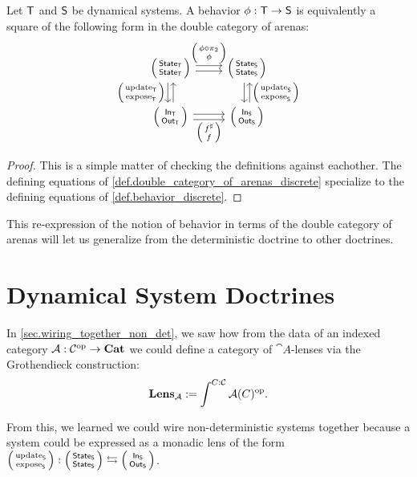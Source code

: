 \documentclass[DynamicalBook]{subfiles}
\begin{document}
\begin{proposition}\label{prop.behavior_as_square_of_arenas_discrete}
  Let $\mathsf{T}$ and $\mathsf{S}$ be dynamical systems. A behavior $\phi : \mathsf{T}
  \to \mathsf{S}$ is equivalently a square of the following form in the double
  category of arenas:
  \begin{equation}\label{eqn.behavior_as_square_of_arenas_discrete}
    \begin{tikzcd}
      \lens{\State{T}}{\State{T}} \ar[r, shift left, "\lens{\phi \circ
        \pi_2}{\phi}"] \ar[r, shift right] \ar[d, shift right,
      "\lens{\update{T}}{\expose{T}}"'] \ar[d, shift left, leftarrow] &
      \lens{\State{S}}{\State{S}} \ar[d, shift left, leftarrow,
      "\lens{\update{S}}{\expose{S}}"] \ar[d, shift right]\\
      \lens{\In{T}}{\Out{T}} \ar[r, shift right, "\lens{f^{\sharp}}{f}"'] \ar[r,
      shift left] & \lens{\In{S}}{\Out{S}}
    \end{tikzcd}
  \end{equation}
\end{proposition}
\begin{proof}
  This is a simple matter of checking the definitions against eachother. The
  defining equations of \cref{def.double_category_of_arenas_discrete} specialize
  to the defining equations of \cref{def.behavior_discrete}.
\end{proof}

This re-expression of the notion of behavior in terms of the double category of
arenas will let us generalize from the deterministic doctrine to other
doctrines.

\section{Dynamical System Doctrines}\label{sec.doctrines}

In \cref{sec.wiring_together_non_det}, we saw how from the data of an indexed
category $\mathcal{A} : \mathcal{C}^{\textnormal{op}} \to \textbf{Cat}$ we could define a category of $\cat{A}$-lenses via the Grothendieck
construction:
$$\textbf{Lens}_{\mathcal{A}} := \int^{C : \mathcal{C}}\mathcal{A}(C)^{\textnormal{op}}.$$

From this, we learned we could wire non-deterministic systems together because a
system could be expressed as a monadic lens of the form
$\lens{\update{S}}{\expose{S}} : \lens{\State{S}}{\State{S}} \fromto
\lens{\In{S}}{\Out{S}}$. 
\end{document}
